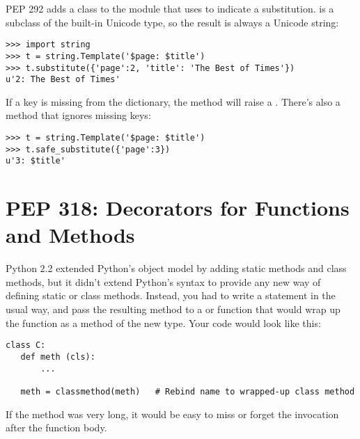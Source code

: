 \documentclass{howto}
\begin{document}
PEP 292 adds a  class to the  module
that uses \samp{\$} to indicate a substitution.   is a
subclass of the built-in Unicode type, so the result is always a
Unicode string:

\begin{verbatim}
>>> import string
>>> t = string.Template('$page: $title')
>>> t.substitute({'page':2, 'title': 'The Best of Times'})
u'2: The Best of Times'
\end{verbatim}


If a key is missing from the dictionary, the  method
will raise a .  There's also a 
method that ignores missing keys:

\begin{verbatim}
>>> t = string.Template('$page: $title')
>>> t.safe_substitute({'page':3})
u'3: $title'
\end{verbatim}



\begin{seealso}
\end{seealso}


\section{PEP 318: Decorators for Functions and Methods}

Python 2.2 extended Python's object model by adding static methods and
class methods, but it didn't extend Python's syntax to provide any new
way of defining static or class methods.  Instead, you had to write a
 statement in the usual way, and pass the resulting
method to a  or 
function that would wrap up the function as a method of the new type.
Your code would look like this:

\begin{verbatim}
class C:
   def meth (cls):
       ...
   
   meth = classmethod(meth)   # Rebind name to wrapped-up class method
\end{verbatim}

If the method was very long, it would be easy to miss or forget the
 invocation after the function body.  
\end{document}
